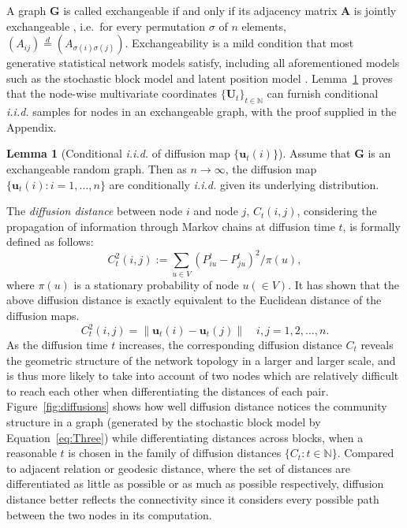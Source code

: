 \documentclass[11pt]{article}
\theoremstyle{definition}
\newtheorem{lemma}[theorem]{Lemma}
\begin{document}
A graph $\mathbf{G}$ is called exchangeable if and only if its adjacency matrix $\mathbf{A}$ is jointly exchangeable \cite{orbanz2015bayesian}, i.e.~for every permutation $\sigma$ of $n$ elements, $(A_{ij}) \stackrel{d}{=} (A_{\sigma(i) \sigma(j)})$. Exchangeability is a mild condition that most generative statistical network models satisfy, including all aforementioned models such as the stochastic block model and latent position model \cite{rohe2011spectral, sussman2014consistent, todeschini2016exchangeable}. Lemma~\ref{main_lemma} proves that the node-wise multivariate coordinates $\{ \mathbf{U}_{t} \}_{t \in \mathbb{N}}$ can furnish conditional \textit{i.i.d.} samples for nodes in an exchangeable graph, with the proof supplied in the Appendix.
\begin{lemma}[Conditional \textit{i.i.d.} of diffusion map $\{\mathbf{u}_{t}(i)\}$]
	\label{main_lemma}
	Assume that $\mathbf{G}$ is an exchangeable random graph. Then as $n \rightarrow \infty$, the diffusion map $\{ \mathbf{u}_{t}(i) : i = 1, \ldots, n \}$ are conditionally \textit{i.i.d.} given its underlying distribution.  
\end{lemma}
The \textit{diffusion distance} between node $i$ and node $j$, $C_{t}(i,j)$, considering the propagation of information through Markov chains at diffusion time $t$, is formally defined as follows:
\begin{equation}
\label{eq:distance}
C^2_{t}(i,j) := \sum\limits_{u \in V} \left( P^{t}_{iu} - P^{t}_{ju}  \right)^2 /  \pi(u),
\end{equation}
where $\pi(u)$ is a stationary probability of node $u (\in V)$. 
It has shown that the above diffusion distance is exactly equivalent to the Euclidean distance of the diffusion maps. 
\begin{equation}
\label{eq:diffusion}
C^2_{t}(i,j)  =   \parallel \mathbf{u}_{t}(i) - \mathbf{u}_{t}(j) \parallel   \quad i,j = 1,2, \ldots , n.
\end{equation}
As the diffusion time $t$ increases, the corresponding diffusion distance $C_{t}$ reveals the geometric structure of the network topology in a larger and larger scale, and is thus more likely to take into account of two nodes which are relatively difficult to reach each other when differentiating the distances of each pair. Figure~\ref{fig:diffusions} shows how well diffusion distance notices the community structure in a graph (generated by the stochastic block model by Equation~\ref{eq:Three}) while differentiating distances across blocks, when a reasonable $t$ is chosen in the family of diffusion distances $\{ C_{t} : t \in \mathbb{N} \}$. Compared to adjacent relation or geodesic distance, where the set of distances are differentiated as little as possible or as much as possible respectively, diffusion distance better reflects the connectivity since it considers every possible path between the two nodes in its computation. 
\end{document}

